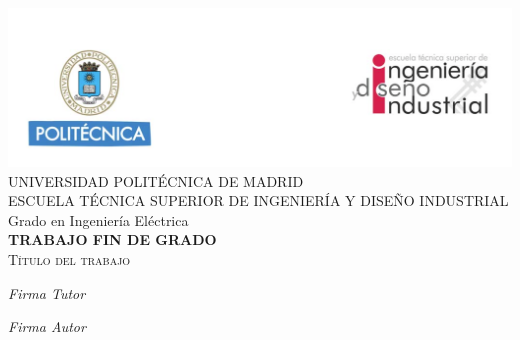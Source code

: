 
\begin{center}
\thispagestyle{empty}
 
\includegraphics[width=1\textwidth]{figuras/cabecera.png}  \\[0.5 cm]

\LARGE UNIVERSIDAD POLITÉCNICA DE MADRID \\ [1 cm]

\LARGE ESCUELA TÉCNICA SUPERIOR DE INGENIERÍA Y DISEÑO INDUSTRIAL \\ [1 cm]

\LARGE Grado en Ingeniería Eléctrica\\ [1 cm]

\LARGE \textbf{TRABAJO FIN DE GRADO}\\[1 cm]

\Huge \textsc{Título del trabajo}\\[4 cm]

\begin{multicols}{2}
	\begin{flushleft} 
		\Large \emph{Firma Tutor}
	\end{flushleft}
	\begin{flushright}
		\Large \emph{Firma Autor}
	\end{flushright}
\end{multicols}



\vfill

\end{center}



\cleardoublepage 